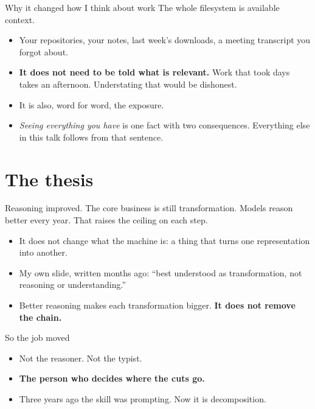 \documentclass[aspectratio=169,t]{beamer}
\begin{document}
\begin{frame}{Why it changed how I think about work}
    The whole filesystem is available context.
    \begin{itemize}
        \item Your repositories, your notes, last week's downloads, a meeting
              transcript you forgot about.
        \item \textbf{It does not need to be told what is relevant.} Work that
              took days takes an afternoon. Understating that would be dishonest.
        \item It is also, word for word, the exposure.
        \item \emph{Seeing everything you have} is one fact with two consequences.
              Everything else in this talk follows from that sentence.
    \end{itemize}
\end{frame}

\section{The thesis}

\begin{frame}{Reasoning improved. The core business is still transformation.}
    Models reason better every year. That raises the ceiling on each step.
    \begin{itemize}
        \item It does not change what the machine is: a thing that turns one
              representation into another.
        \item My own slide, written months ago: ``best understood as
              transformation, not reasoning or understanding.''
        \item Better reasoning makes each transformation bigger.
              \textbf{It does not remove the chain.}
    \end{itemize}
\end{frame}

\begin{frame}{So the job moved}
    \begin{itemize}
        \item Not the reasoner. Not the typist.
        \item \textbf{The person who decides where the cuts go.}
        \item Three years ago the skill was prompting. Now it is decomposition.
    \end{itemize}
\end{frame}
\end{document}
